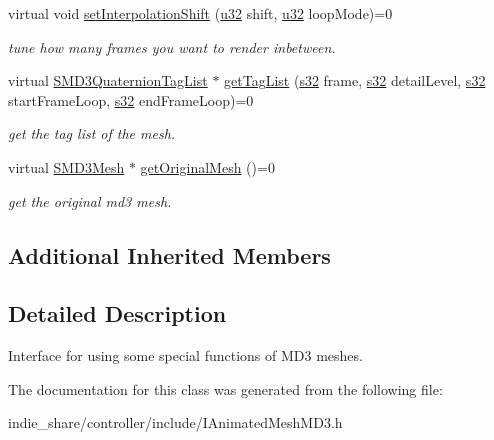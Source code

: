\begin{DoxyCompactItemize}
virtual void \hyperlink{classirr_1_1scene_1_1IAnimatedMeshMD3_ae72d5c1bbef975834ddb3fdf8d73e608}{set\+Interpolation\+Shift} (\hyperlink{namespaceirr_a0416a53257075833e7002efd0a18e804}{u32} shift, \hyperlink{namespaceirr_a0416a53257075833e7002efd0a18e804}{u32} loop\+Mode)=0
\begin{DoxyCompactList}\small\item\em tune how many frames you want to render inbetween. \end{DoxyCompactList}\item 
\mbox{\label{classirr_1_1scene_1_1IAnimatedMeshMD3_a1de2fa2fc55ab8fb7f881f3e9a9b0d78}} 
virtual \hyperlink{structirr_1_1scene_1_1SMD3QuaternionTagList}{S\+M\+D3\+Quaternion\+Tag\+List} $\ast$ \hyperlink{classirr_1_1scene_1_1IAnimatedMeshMD3_a1de2fa2fc55ab8fb7f881f3e9a9b0d78}{get\+Tag\+List} (\hyperlink{namespaceirr_ac66849b7a6ed16e30ebede579f9b47c6}{s32} frame, \hyperlink{namespaceirr_ac66849b7a6ed16e30ebede579f9b47c6}{s32} detail\+Level, \hyperlink{namespaceirr_ac66849b7a6ed16e30ebede579f9b47c6}{s32} start\+Frame\+Loop, \hyperlink{namespaceirr_ac66849b7a6ed16e30ebede579f9b47c6}{s32} end\+Frame\+Loop)=0
\begin{DoxyCompactList}\small\item\em get the tag list of the mesh. \end{DoxyCompactList}\item 
\mbox{\label{classirr_1_1scene_1_1IAnimatedMeshMD3_ac6b6b53da9413b4404bcad0e68561bcb}} 
virtual \hyperlink{structirr_1_1scene_1_1SMD3Mesh}{S\+M\+D3\+Mesh} $\ast$ \hyperlink{classirr_1_1scene_1_1IAnimatedMeshMD3_ac6b6b53da9413b4404bcad0e68561bcb}{get\+Original\+Mesh} ()=0
\begin{DoxyCompactList}\small\item\em get the original md3 mesh. \end{DoxyCompactList}\end{DoxyCompactItemize}
\subsection*{Additional Inherited Members}


\subsection{Detailed Description}
Interface for using some special functions of M\+D3 meshes. 

The documentation for this class was generated from the following file\+:\begin{DoxyCompactItemize}
\item 
indie\+\_\+share/controller/include/I\+Animated\+Mesh\+M\+D3.\+h\end{DoxyCompactItemize}
